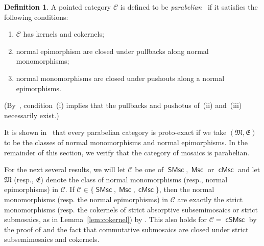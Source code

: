 \documentclass[reqno]{amsart}
\newcommand{\cat}[1]{\ensuremath{\mathsf{#1}}}
\newcommand{\catC}{\mathcal{C}}
\newcommand{\cC}{\ensuremath{\mathcal{C}}}
\DeclareMathOperator{\Msc}{\cat{Msc}}
\DeclareMathOperator{\cMsc}{\cat{cMsc}}
\DeclareMathOperator{\cSMsc}{\cat{cSMsc}}
\DeclareMathOperator{\SMsc}{\cat{SMsc}}
\numberwithin{equation}{section}
\theoremstyle{plain}
\theoremstyle{definition}
\newtheorem{definition}[equation]{Definition}
\begin{document}
\begin{definition}
A pointed category $\catC$ is defined to be \emph{parabelian}~\cite{Mozgovoy} if it satisfies the following conditions:
\begin{enumerate}[label=(\roman*)]
    \item $\catC$ has kernels and cokernels; 
    \item  normal epimorphism  are closed under pullbacks along normal monomorphisms;
    \item normal monomorphisms are closed under pushouts along a normal epimorphisms.
\end{enumerate}
(By~\cite[Lemma~1.3]{Mozgovoy}, condition~(i) implies that the pullbacks and pushotus of~(ii) and~(iii) necessarily exist.)
\end{definition}


It is shown in~\cite[Theorem~1.10]{Mozgovoy} that every parabelian category is proto-exact if we take $(\mathfrak{M}, \mathfrak{E})$ to be the classes of normal monomorphisms and normal epimorphisms. In the remainder of this section, we verify that the category of mosaics is parabelian.


For the next several results, we will let $\cC$ be one of $\SMsc, \Msc$ or $\cMsc$ and let $\mathfrak{M}$ (resp., $\mathfrak{E}$) denote the class of normal monomorphisms (resp., normal epimorphisms) in $\cC$. If $\cC\in\{\SMsc, \Msc, \cMsc\}$, then the normal monomorphisms (resp. the normal epimorphisms) in $\cC$ are exactly the strict monomorphisms 
(resp. the 
cokernels of strict absorptive subsemimosaics or strict submosaics, as in Lemma~\ref{lem:cokernel})
by \cite[Theorem 1.2]{NakamuraReyes}. This also holds for $\cC=\cSMsc$ by the proof of \cite[Theorem 3.16]{NakamuraReyes} and the fact that commutative submosaics are closed under strict subsemimosaics and cokernels.
\end{document}
